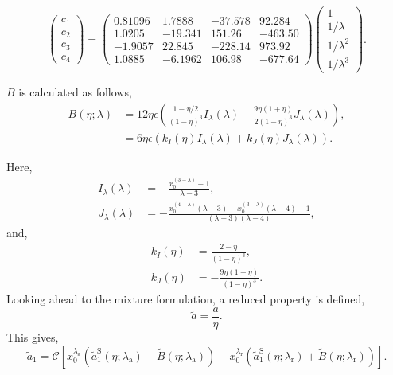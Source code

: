 \documentclass[english]{../thermomemo/thermomemo}
\newcommand*{\lb}{\left(}
\newcommand*{\rb}{\right)}
\newcommand{\lama}{\ensuremath{{\lambda_{\text{a}}}}\xspace}
\newcommand{\lamr}{\ensuremath{{\lambda_{\text{r}}}}\xspace}
\newcommand{\aSt}{\ensuremath{\tilde{a}_{1}^{\text{S}}}\xspace}
\newcommand{\Bt}{\ensuremath{\tilde{B}}\xspace}
\begin{document}
\begin{equation}
  \label{eq:c_param}
  \begin{pmatrix}
    c_1 \\
    c_2 \\
    c_3 \\
    c_4
  \end{pmatrix} = \begin{pmatrix}
    0.81096 & 1.7888 & -37.578  & 92.284 \\
    1.0205 & -19.341 & 151.26 & -463.50 \\
    -1.9057 & 22.845 & -228.14 & 973.92 \\
    1.0885 & -6.1962 & 106.98 & -677.64
  \end{pmatrix}
    \begin{pmatrix}
    1 \\
    1/\lambda \\
    1/\lambda^2 \\
    1/\lambda^3
  \end{pmatrix}.
\end{equation}

$B$ is calculated as follows,
\begin{align}
  \label{eq:c_B}
  B \lb \eta; \lambda \rb &= 12 \eta \epsilon \lb \frac{1 - \eta/2}{\lb 1 - \eta\rb^3} I_\lambda \lb \lambda \rb - \frac{9\eta\lb 1+ \eta\rb}{2 \lb 1- \eta\rb^3} J_\lambda \lb \lambda \rb \rb,\\
                          &= 6 \eta \epsilon \lb k_I \lb \eta \rb I_\lambda \lb \lambda \rb + k_J \lb \eta \rb J_\lambda \lb \lambda \rb \rb.
\end{align}

Here,
\begin{align}
  \label{eq:I_lambda}
  I_\lambda \lb \lambda \rb &= -\frac{x_0^{\lb 3-\lambda\rb} - 1}{\lambda - 3},\\
  \label{eq:J_lambda}
  J_\lambda \lb \lambda \rb &= -\frac{x_0^{\lb 4-\lambda\rb}\lb \lambda - 3\rb -x_0^{\lb 3-\lambda\rb}\lb \lambda - 4\rb - 1}{\lb \lambda - 3\rb \lb \lambda - 4\rb},
\end{align}
and,
\begin{align}
  \label{eq:kI}
  k_I \lb \eta \rb &= \frac{2-\eta}{\lb 1 - \eta\rb^3},\\
  \label{eq:kJ}
  k_J \lb \eta \rb &= -\frac{9\eta\lb 1+ \eta\rb}{\lb 1 - \eta\rb^3}.
\end{align}
Looking ahead to the mixture formulation, a reduced property is defined,
\begin{equation}
  \label{eq:eta_red}
  \tilde{a} = \frac{a}{\eta}.
\end{equation}
This gives,
\begin{equation}
  \label{eq:a_1_approx_red}
  \tilde{a}_1 = \mathcal{C} \left[ x_0^\lama \lb \aSt \lb \eta; \lama \rb + \Bt \lb \eta; \lama \rb  \rb - x_0^\lamr \lb \aSt \lb \eta; \lamr \rb + \Bt \lb \eta; \lamr \rb  \rb\right].
\end{equation}
\end{document}
